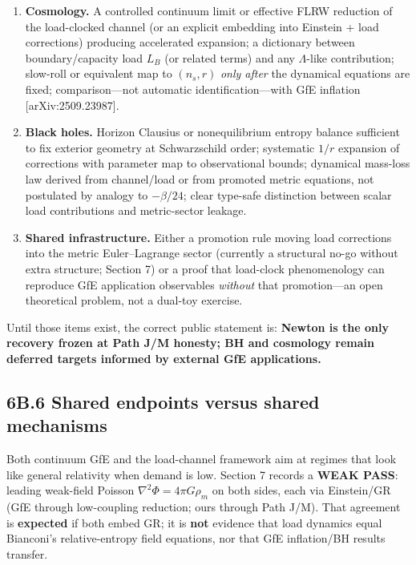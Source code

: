 \documentclass[
  11pt,
]{article}
\newcounter{none} %
\providecommand{\tightlist}{%
  \setlength{\itemsep}{0pt}\setlength{\parskip}{0pt}}
\begin{document}
\begin{enumerate}
\def\labelenumi{\arabic{enumi}.}
\tightlist
\item
  \textbf{Cosmology.} A controlled continuum limit or effective FLRW reduction of the load-clocked channel (or an explicit embedding into Einstein + load corrections) producing accelerated expansion; a dictionary between boundary/capacity load \(L_B\) (or related terms) and any \(\Lambda\)-like contribution; slow-roll or equivalent map to \((n_s,r)\) \emph{only after} the dynamical equations are fixed; comparison---not automatic identification---with GfE inflation {[}arXiv:2509.23987{]}.
\item
  \textbf{Black holes.} Horizon Clausius or nonequilibrium entropy balance sufficient to fix exterior geometry at Schwarzschild order; systematic \(1/r\) expansion of corrections with parameter map to observational bounds; dynamical mass-loss law derived from channel/load or from promoted metric equations, not postulated by analogy to \(-\beta/24\); clear type-safe distinction between scalar load contributions and metric-sector leakage.
\item
  \textbf{Shared infrastructure.} Either a promotion rule moving load corrections into the metric Euler--Lagrange sector (currently a structural no-go without extra structure; Section 7) or a proof that load-clock phenomenology can reproduce GfE application observables \emph{without} that promotion---an open theoretical problem, not a dual-toy exercise.
\end{enumerate}

Until those items exist, the correct public statement is: \textbf{Newton is the only recovery frozen at Path J/M honesty; BH and cosmology remain deferred targets informed by external GfE applications.}

\subsection{6B.6 Shared endpoints versus shared mechanisms}\label{b.6-shared-endpoints-versus-shared-mechanisms}

Both continuum GfE and the load-channel framework aim at regimes that look like general relativity when demand is low. Section 7 records a \textbf{WEAK PASS}: leading weak-field Poisson \(\nabla^2\Phi=4\pi G\rho_m\) on both sides, each via Einstein/GR (GfE through low-coupling reduction; ours through Path J/M). That agreement is \textbf{expected} if both embed GR; it is \textbf{not} evidence that load dynamics equal Bianconi's relative-entropy field equations, nor that GfE inflation/BH results transfer.
\end{document}
